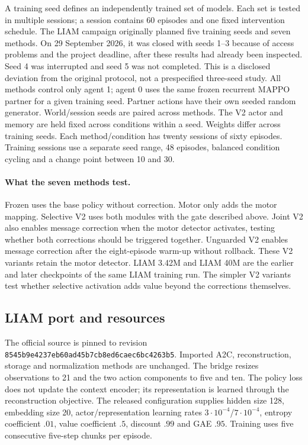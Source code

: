 \documentclass[10pt,a4paper]{article}
\begin{document}
A training seed defines an independently trained set of models. Each set is tested in multiple sessions; a session contains 60 episodes and one fixed intervention schedule. The LIAM campaign originally planned five training seeds and seven methods. On 29 September 2026, it was closed with seeds 1--3 because of access problems and the project deadline, after these results had already been inspected. Seed 4 was interrupted and seed 5 was not completed. This is a disclosed deviation from the original protocol, not a prespecified three-seed study. All methods control only agent 1; agent 0 uses the same frozen recurrent MAPPO partner for a given training seed. Partner actions have their own seeded random generator. World/session seeds are paired across methods. The V2 actor and memory are held fixed across conditions within a seed. Weights differ across training seeds. Each method/condition has twenty sessions of sixty episodes. Training sessions use a separate seed range, 48 episodes, balanced condition cycling and a change point between 10 and 30.

\paragraph{What the seven methods test.}
Frozen uses the base policy without correction. Motor only adds the motor mapping. Selective V2 uses both modules with the gate described above. Joint V2 also enables message correction when the motor detector activates, testing whether both corrections should be triggered together. Unguarded V2 enables message correction after the eight-episode warm-up without rollback. These V2 variants retain the motor detector. LIAM 3.42M and LIAM 40M are the earlier and later checkpoints of the same LIAM training run. The simpler V2 variants test whether selective activation adds value beyond the corrections themselves.

\subsection{LIAM port and resources}
The official source is pinned to revision \texttt{8545b9e4237eb60ad45b7cb8ed6caec6bc4263b5}. Imported A2C, reconstruction, storage and normalization methods are unchanged. The bridge resizes observations to 21 and the two action components to five and ten. The policy loss does not update the context encoder; its representation is learned through the reconstruction objective. The released configuration supplies hidden size 128, embedding size 20, actor/representation learning rates $3\cdot10^{-4}$/$7\cdot10^{-4}$, entropy coefficient $.01$, value coefficient $.5$, discount $.99$ and GAE $.95$. Training uses five consecutive five-step chunks per episode.
\end{document}
